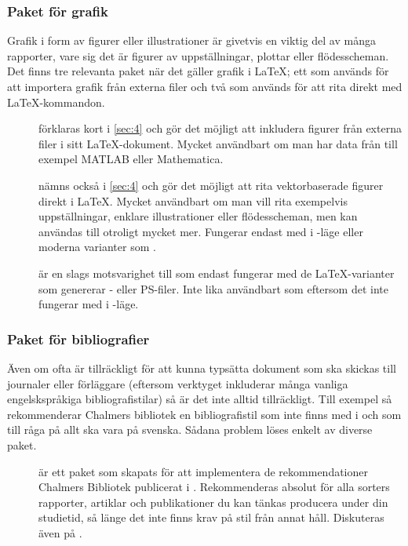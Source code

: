 \documentclass[lang=sv,ptsize=10pt,font=none,nomath,titles=bf,../../a4.tex]{subfiles}
\begin{document}
\subsubsection{Paket för grafik}
Grafik i form av figurer eller illustrationer är givetvis en viktig del
av många rapporter, vare sig det är figurer av uppställningar, plottar
eller flödesscheman. Det finns tre relevanta paket när det gäller grafik
i \LaTeX; ett som används för att importera grafik från externa filer och
två som används för att rita direkt med \LaTeX-kommandon.

\begin{description}
	\item[]
	förklaras kort i \cref{sec:4} och gör det möjligt att inkludera
	figurer från externa filer i sitt \LaTeX-dokument. Mycket användbart
	om man har data från till exempel MATLAB eller Mathematica.
	
	\item[]
	nämns också i \cref{sec:4} och gör det möjligt att rita
	vektorbaserade figurer direkt i \LaTeX. Mycket användbart om man
	vill rita exempelvis uppställningar, enklare illustrationer eller 
	flödesscheman, men kan användas till otroligt mycket mer. Fungerar
	endast med \pdfLaTeX{} i \PDF-läge eller moderna varianter som
	\XeTeX.

	\item[]
	är en slags motsvarighet till  som endast fungerar med de
	\LaTeX-varianter som genererar \DVI- eller \textsc{PS}-filer. Inte
	lika användbart som  eftersom det inte fungerar med 
	\pdfLaTeX{} i \PDF-läge.
\end{description}

\subsubsection{Paket för bibliografier}
Även om \BibTeX ofta är tillräckligt för att kunna typsätta dokument som
ska skickas till journaler eller förläggare (eftersom verktyget
inkluderar många vanliga engelskspråkiga bibliografistilar) så är det inte
alltid tillräckligt. Till exempel så rekommenderar Chalmers bibliotek
en bibliografistil som inte finns med i \BibTeX och som till råga på allt
ska vara på svenska. Sådana problem löses enkelt av diverse paket.

\begin{description}
	\item[{}]
	är ett paket som skapats för att implementera de rekommendationer
	Chalmers Bibliotek publicerat \parencite{ChsLib10} i \BibTeX.
	Rekommenderas absolut för alla sorters rapporter, artiklar och
	publikationer du kan tänkas producera under din studietid, så länge
	det inte finns krav på stil från annat håll. Diskuteras även på
	.
\end{description}
\end{document}
